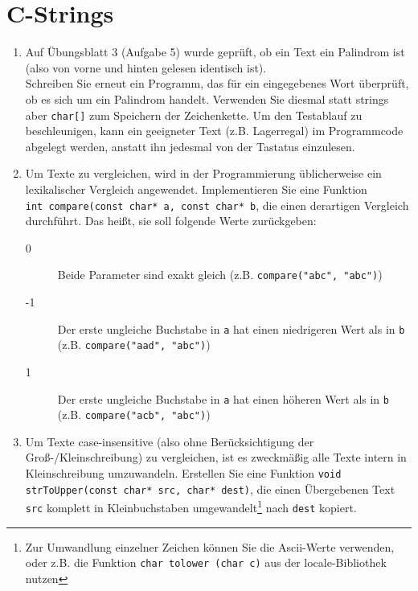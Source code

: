 \documentclass[paper=a4, fontsize=11pt, twoside]{scrartcl}
\begin{document}
\section*{C-Strings}
\begin{enumerate}[resume]
  \item Auf Übungsblatt 3 (Aufgabe 5) wurde geprüft, ob ein Text ein Palindrom ist (also von vorne und hinten gelesen identisch ist). \\
Schreiben Sie erneut ein Programm, das für ein eingegebenes Wort überprüft, ob es sich um ein Palindrom handelt. Verwenden Sie diesmal statt strings aber \texttt{char[]} zum Speichern der Zeichenkette. Um den Testablauf zu beschleunigen, kann ein geeigneter Text (z.B. \glqq Lagerregal\grqq) im Programmcode abgelegt werden, anstatt ihn jedesmal von der Tastatus einzulesen. 
  \item Um Texte zu vergleichen, wird in der Programmierung üblicherweise ein lexikalischer Vergleich angewendet. Implementieren Sie eine Funktion \\\texttt{int compare(const char* a, const char* b}, die einen derartigen Vergleich durchführt. Das heißt, sie soll folgende Werte zurückgeben:
    \begin{description}
      \item[0] Beide Parameter sind exakt gleich (z.B. \texttt{compare("abc", "abc")})
      \item[-1] Der erste ungleiche Buchstabe in \texttt{a} hat einen niedrigeren Wert als in \texttt{b} (z.B. \texttt{compare("aad", "abc")})
      \item[1] Der erste ungleiche Buchstabe in \texttt{a} hat einen höheren Wert als in \texttt{b} (z.B. \texttt{compare("acb", "abc")})
    \end{description}
  \item Um Texte case-insensitive (also ohne Berücksichtigung der Groß-/Kleinschreibung) zu vergleichen, ist es zweckmäßig alle Texte intern in Kleinschreibung umzuwandeln. Erstellen Sie eine Funktion \texttt{void strToUpper(const char* src, char* dest)}, die einen Übergebenen Text \texttt{src} komplett in Kleinbuchstaben umgewandelt\footnote{Zur Umwandlung einzelner Zeichen können Sie die Ascii-Werte verwenden, oder z.B. die Funktion \texttt{char tolower (char c)} aus der locale-Bibliothek nutzen} nach \texttt{dest} kopiert.

\end{enumerate}
\end{document}
